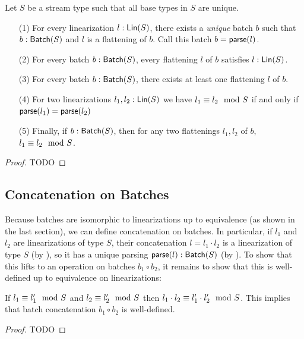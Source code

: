 \begin{proposition}
\label{prop:batch-lin-correspondence}
Let $S$ be a stream type such that all base types in $S$ are unique.
\begin{enumerate}
\item[(1)] For every linearization $l: \mathsf{Lin}({S})$, there exists a \emph{unique} batch $b$ such that $b: \mathsf{Batch}({S})$ and $l$ is a flattening of $b$. Call this batch $b = \mathsf{parse}(l)$.
\item[(2)] For every batch $b: \mathsf{Batch}({S})$, every flattening $l$ of $b$ satisfies $l: \mathsf{Lin}({S})$.
\item[(3)] For every batch $b: \mathsf{Batch}({S})$, there exists at least one flattening $l$ of $b$.
\item[(4)] For two linearizations $l_1, l_2: \mathsf{Lin}({S})$ we have $l_1 \equiv l_2 \mod {S}$ if and only if $\mathsf{parse}(l_1) = \mathsf{parse}(l_2)$
\item[(5)] Finally, if $b: \mathsf{Batch}({S})$, then for any two flattenings $l_1, l_2$ of $b$, $l_1 \equiv l_2 \mod {S}$.
\end{enumerate}
\end{proposition}
\begin{proof}
TODO
\end{proof}

\subsection{Concatenation on Batches}

Because batches are isomorphic to linearizations up to equivalence (as shown in the last section), we can define concatenation on batches. In particular, if $l_1$ and $l_2$ are linearizations of type $S$,
their concatenation $l = l_1 \cdot l_2$ is a linearization of type $S$
(by ),
so it has a unique parsing $\mathsf{parse}(l): \mathsf{Batch}({S})$ (by ).
To show that this lifts to an operation on batches $b_1 \circ b_2$, it remains to show that this is well-defined up to equivalence on linearizations:
\begin{proposition}
\label{batch-concatenation-well-defined}
If $l_1 \equiv l_1' \mod {S}$ and $l_2 \equiv l_2' \mod {S}$
then $l_1 \cdot l_2 \equiv l_1' \cdot l_2' \mod {S}$.
This implies that batch concatenation $b_1 \circ b_2$ is well-defined.
\end{proposition}
\begin{proof}
TODO
\end{proof}

